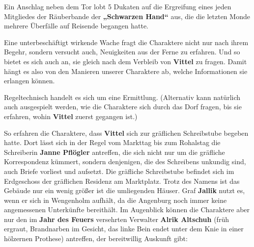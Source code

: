 	Ein Anschlag neben dem Tor lobt 5 Dukaten auf die Ergreifung eines jeden Mitgliedes der Räuberbande der \textbf{„Schwarzen Hand“} aus, die die letzten Monde mehrere Überfälle auf Reisende begangen hatte.
	
	Eine unterbeschäftigt wirkende Wache fragt die Charaktere nicht nur nach ihrem Begehr, sondern versucht auch, Neuigkeiten aus der Ferne zu erfahren.
	Und so bietet es sich auch an, sie gleich nach dem Verbleib von \textbf{Vittel} zu fragen.
	Damit hängt es also von den Manieren unserer Charaktere ab, welche Informationen sie erlangen können. 

Regeltechnisch handelt es sich um eine Ermittlung.
(Alternativ kann natürlich auch ausgespielt werden, wie die Charaktere sich durch das Dorf fragen, bis sie erfahren, wohin \textbf{Vittel} zuerst gegangen ist.)



So erfahren die Charaktere, dass \textbf{Vittel} sich zur gräflichen Schreibstube begeben hatte.
Dort lässt sich in der Regel vom Markttag bis zum Rohalstag die Schreiberin \textbf{Janne Pflögler} antreffen, die sich nicht nur um die gräfliche Korrespondenz kümmert, sondern denjenigen, die des Schreibens unkundig sind, auch Briefe vorliest und aufsetzt.
Die gräfliche Schreibstube befindet sich im Erdgeschoss der gräflichen Residenz am Marktplatz.
Trotz des Namens ist das Gebäude nur ein wenig größer ist die umliegenden Häuser.
Graf \textbf{Jallik} nutzt es, wenn er sich in Wengenholm aufhält, da die Angenburg noch immer keine angemessenen Unterkünfte bereithält.
Im Augenblick können die Charaktere aber nur den im \textbf{Jahr des Feuers} versehrten Verwalter \textbf{Alrik Altschuh} (früh ergraut, Brandnarben im Gesicht, das linke Bein endet unter dem Knie in einer hölzernen Prothese) antreffen, der bereitwillig Auskunft gibt:


